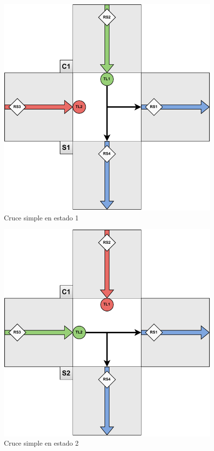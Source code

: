 \begin{figure}[H]
    \centering
    \includegraphics[width=1\linewidth]{text/image/DCruc-CS-Estado1.pdf}
    \caption{Cruce simple en estado 1}
    \label{fig:cruce_simple_estado_1}
\end{figure}

\begin{figure}[H]
    \centering
    \includegraphics[width=1\linewidth]{text/image/DCruc-CS-Estado2.pdf}
    \caption{Cruce simple en estado 2}
    \label{fig:cruce_simple_estado_2}
\end{figure}

